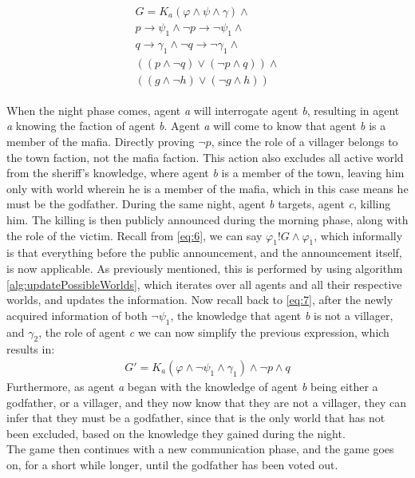 \begin{align}
	\begin{split}
		G = K_a(\varphi \land \psi \land\gamma)\land                        \\
		p \rightarrow \psi_1 \land \neg p \rightarrow \neg \psi_1 \land     \\
		q \rightarrow \gamma_1 \land \neg q \rightarrow \neg \gamma_1 \land \\
		((p \land \neg q) \lor (\neg p \land q)) \land                      \\
		((g \land \neg h) \lor (\neg g \land h))
		\label{eq:7}
	\end{split}
\end{align}

When the night phase comes, agent \textit{a} will interrogate agent \textit{b},
resulting in agent \textit{a} knowing the faction of agent \textit{b}. Agent
\textit{a} will come to know that agent \textit{b} is a member of the mafia.
Directly proving $\neg p$, since the role of a villager belongs to the town
faction, not the mafia faction. This action also excludes all active world from
the sheriff's knowledge, where agent \textit{b} is a member of the town,
leaving him only with world wherein he is a member of the mafia, which in this
case means he must be the godfather. During the same night, agent \textit{b}
targets, agent \textit{c}, killing him. The killing is then publicly announced
during the morning phase, along with the role of the victim. Recall from
\cref{eq:6}, we can say $\varphi_1!G\land\varphi_1$, which informally is that
everything before the public announcement, and the announcement itself, is now
applicable. As previously mentioned, this is performed by using algorithm
\ref{alg:updatePossibleWorlds}, which iterates over all agents and all their
respective worlds, and updates the information. Now recall back to \cref{eq:7},
after the newly acquired information of both $\neg \psi_1$, the knowledge that
agent \textit{b} is not a villager, and $\gamma_2$, the role of agent
\textit{c} we can now simplify the previous expression, which results in:
\begin{align}
	G' = K_a(\varphi \land \neg \psi_1 \land \gamma_1) \land \neg p \land q
\end{align}
Furthermore, as agent \textit{a} began with the knowledge of agent \textit{b}
being either a godfather, or a villager, and they now know that they are not a
villager, they can infer that they must be a godfather, since that is the only
world that has not been excluded, based on the knowledge they gained during the
night. \\
The game then continues with a new communication phase, and the game goes on,
for a short while longer, until the godfather has been voted out.
